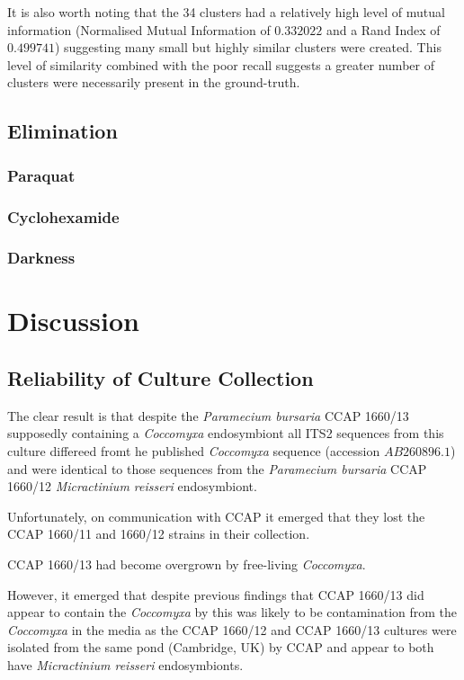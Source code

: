 It is also worth noting that the 34 clusters had a relatively high level of mutual information
(Normalised Mutual Information of \(0.332022\) and a Rand Index of \(0.499741\)) suggesting
many small but highly similar clusters were created.  This level of similarity combined
with the poor recall suggests a greater number of clusters were necessarily present in the
ground-truth.

\subsection{Elimination}
\subsubsection{Paraquat}
\subsubsection{Cyclohexamide}
\subsubsection{Darkness}





\section{Discussion}

\subsection{Reliability of Culture Collection}

The clear result is that despite the \textit{Paramecium bursaria} CCAP 1660/13
supposedly containing a \textit{Coccomyxa} endosymbiont 
all ITS2 sequences from this culture differeed fromt he published
\textit{Coccomyxa} sequence (accession \(AB260896.1\)) and were identical
to those sequences from the \textit{Paramecium bursaria} CCAP 1660/12 \textit{Micractinium
reisseri} endosymbiont.



Unfortunately, on communication with CCAP it emerged that they lost
the CCAP 1660/11 and 1660/12 strains in their collection. 


CCAP 1660/13 had become overgrown by free-living \textit{Coccomyxa}. 

However, it emerged that despite previous findings that CCAP 1660/13
did appear to contain the \textit{Coccomyxa} by \citep{Imamura2008} this was
likely to be contamination from the \textit{Coccomyxa} in the media as 
the CCAP 1660/12 and CCAP 1660/13 cultures were isolated from the same
pond (Cambridge, UK) by CCAP and appear to both have \textit{Micractinium
reisseri} endosymbionts.

